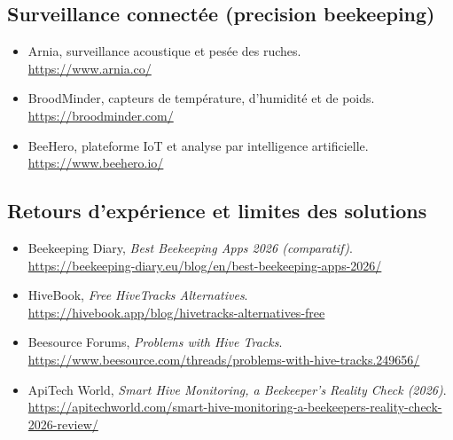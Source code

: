 \subsection*{Surveillance connectée (precision beekeeping)}
\begin{itemize}
  \item Arnia, surveillance acoustique et pesée des ruches.\\ \url{https://www.arnia.co/}
  \item BroodMinder, capteurs de température, d'humidité et de poids.\\ \url{https://broodminder.com/}
  \item BeeHero, plateforme IoT et analyse par intelligence artificielle.\\ \url{https://www.beehero.io/}
\end{itemize}

\subsection*{Retours d'expérience et limites des solutions}
\begin{itemize}
  \item Beekeeping Diary, \emph{Best Beekeeping Apps 2026 (comparatif)}.\\ \url{https://beekeeping-diary.eu/blog/en/best-beekeeping-apps-2026/}
  \item HiveBook, \emph{Free HiveTracks Alternatives}.\\ \url{https://hivebook.app/blog/hivetracks-alternatives-free}
  \item Beesource Forums, \emph{Problems with Hive Tracks}.\\ \url{https://www.beesource.com/threads/problems-with-hive-tracks.249656/}
  \item ApiTech World, \emph{Smart Hive Monitoring, a Beekeeper's Reality Check (2026)}.\\ \url{https://apitechworld.com/smart-hive-monitoring-a-beekeepers-reality-check-2026-review/}
\end{itemize}
